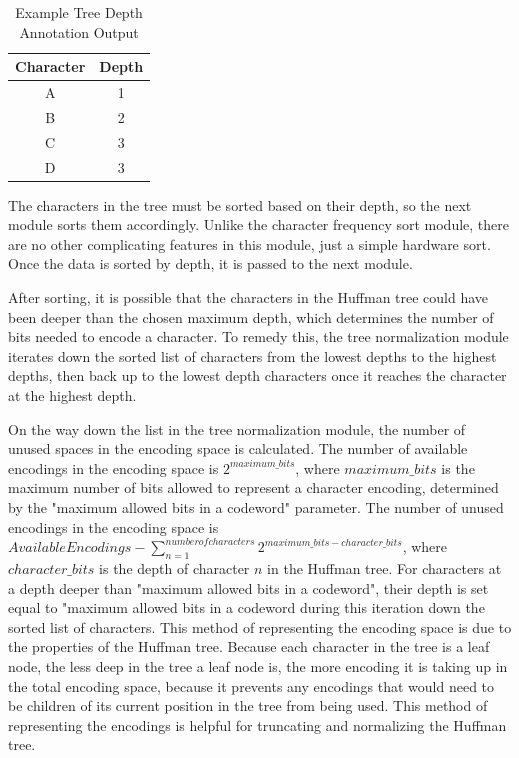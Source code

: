 \documentclass[doublespace,nopageskip]{VTthesis}
\begin{document}
\begin{table}[htb]
	\centering
	\caption{Example Tree Depth Annotation Output}
	\begin{tabular}{cc}
	    \toprule
	    Character & Depth \\
	    \midrule
	    A & 1 \\
	    \midrule
	    B & 2 \\
	    \midrule
	    C & 3 \\
	    \midrule
	    D & 3 \\
	    \bottomrule
	\end{tabular}
	\label{tab:tree_depth_annotation_output}
\end{table}

The characters in the tree must be sorted based on their depth, so the next module sorts them accordingly. Unlike the character frequency sort module, there are no other complicating features in this module, just a simple hardware sort. Once the data is sorted by depth, it is passed to the next module.

After sorting, it is possible that the characters in the Huffman tree could have been deeper than the chosen maximum depth, which determines the number of bits needed to encode a character. To remedy this, the tree normalization module iterates down the sorted list of characters from the lowest depths to the highest depths, then back up to the lowest depth characters once it reaches the character at the highest depth.

On the way down the list in the tree normalization module, the number of unused spaces in the encoding space is calculated. The number of available encodings in the encoding space is $2^{maximum\_bits}$, where $maximum\_bits$ is the maximum number of bits allowed to represent a character encoding, determined by the "maximum allowed bits in a codeword" parameter. The number of unused encodings in the encoding space is $Available Encodings - \sum_{n=1}^{number of characters}2^{maximum\_bits-character\_bits}$, where $character\_bits$ is the depth of character $n$ in the Huffman tree. For characters at a depth deeper than "maximum allowed bits in a codeword", their depth is set equal to "maximum allowed bits in a codeword during this iteration down the sorted list of characters. This method of representing the encoding space is due to the properties of the Huffman tree. Because each character in the tree is a leaf node, the less deep in the tree a leaf node is, the more encoding it is taking up in the total encoding space, because it prevents any encodings that would need to be children of its current position in the tree from being used. This method of representing the encodings is helpful for truncating and normalizing the Huffman tree.
\end{document}
